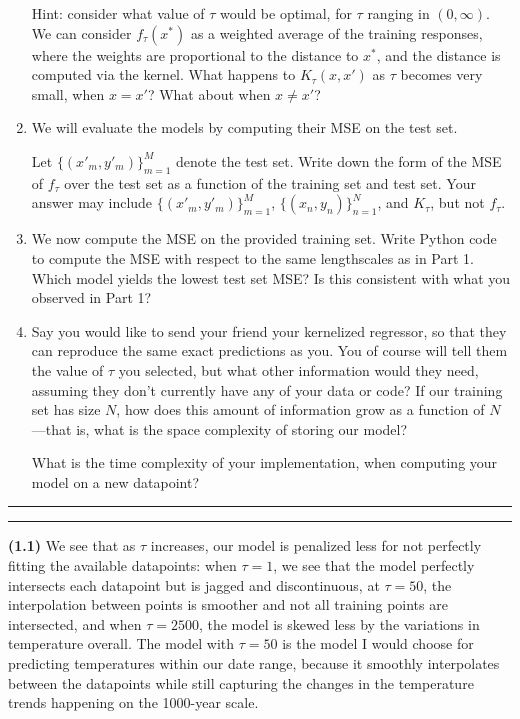 \documentclass[submit]{harvardml}
\newcommand{\question}[2] {\vspace{.25in} \hrule\vspace{0.5em}
\noindent{\bf #1: #2} \vspace{0.5em}
\hrule \vspace{.10in}}
\renewcommand{\part}[1] {\vspace{.10in} {\bf (#1)}}
\begin{document}
\begin{problem}
\begin{enumerate}
Hint: consider what value of $\tau$ would be optimal, for $\tau$ ranging in $(0, \infty)$. We can consider $f_\tau(x^*)$ as a weighted average of the training responses, where the weights are proportional to the distance to $x^*$, and the distance is computed via the kernel. What happens to $K_\tau(x, x')$ as $\tau$ becomes very small, when $x = x'$? What about when $x \neq x'$?

\item We will evaluate the models by computing their MSE on the test set. 

Let $\{(x'_m, y'_m)\}_{m = 1} ^M$ denote the test set. Write down the form of the MSE of $f_\tau$ over the test set as a function of the training set and test set. Your answer may include $\{(x'_m, y'_m)\}_{m = 1} ^M$, $\{(x_n, y_n)\}_{n = 1} ^N$, and $K_\tau$, but not $f_\tau$.

\item We now compute the MSE on the provided training set. Write Python code to compute the MSE with respect to the same lengthscales as in Part 1. Which model yields the lowest test set MSE? Is this consistent with what you observed in Part 1?

\item 
Say you would like to send your friend your kernelized regressor, so that they can reproduce the same exact predictions as you. You of course will tell them the value of $\tau$ you selected, but what other information would they need, assuming they don't currently have any of your data or code? If our training set has size $N$, how does this amount of information grow as a function of $N$—that is, what is the space complexity of storing our model?

What is the time complexity of your implementation, when computing your model on a new datapoint? 
\end{enumerate}

\end{problem}

\newpage

\question{1}{Optimizing a Kernel}
\part{1.1} We see that as $\tau$ increases, our model is penalized less for not perfectly fitting the available datapoints: when $\tau=1$, we see that the model perfectly intersects each datapoint but is jagged and discontinuous, at $\tau=50$, the interpolation between points is smoother and not all training points are intersected, and when $\tau=2500$, the model is skewed less by the variations in temperature overall. The model with $\tau=50$ is the model I would choose for predicting temperatures within our date range, because it smoothly interpolates between the datapoints while still capturing the changes in the temperature trends happening on the 1000-year scale.
\end{document}
